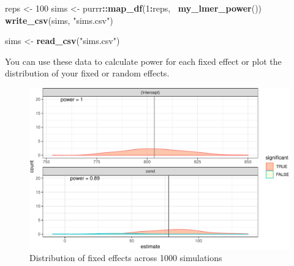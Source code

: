 \documentclass[man,floatsintext]{apa6}
\newenvironment{Shaded}{\begin{snugshade}}{\end{snugshade}}
\newcommand{\KeywordTok}[1]{\textcolor[rgb]{0.13,0.29,0.53}{\textbf{#1}}}
\newcommand{\DecValTok}[1]{\textcolor[rgb]{0.00,0.00,0.81}{#1}}
\newcommand{\StringTok}[1]{\textcolor[rgb]{0.31,0.60,0.02}{#1}}
\newcommand{\OperatorTok}[1]{\textcolor[rgb]{0.81,0.36,0.00}{\textbf{#1}}}
\newcommand{\NormalTok}[1]{#1}
\begin{document}
\begin{Shaded}
\begin{Highlighting}[]
\NormalTok{reps <-}\StringTok{ }\DecValTok{100}
\NormalTok{sims <-}\StringTok{ }\NormalTok{purrr}\OperatorTok{::}\KeywordTok{map_df}\NormalTok{(}\DecValTok{1}\OperatorTok{:}\NormalTok{reps, }\OperatorTok{~}\KeywordTok{my_lmer_power}\NormalTok{())}
\KeywordTok{write_csv}\NormalTok{(sims, }\StringTok{"sims.csv"}\NormalTok{)}
\end{Highlighting}
\end{Shaded}

\begin{Shaded}
\begin{Highlighting}[]
\NormalTok{sims <-}\StringTok{ }\KeywordTok{read_csv}\NormalTok{(}\StringTok{"sims.csv"}\NormalTok{)}
\end{Highlighting}
\end{Shaded}

You can use these data to calculate power for each fixed effect or plot
the distribution of your fixed or random effects.

\begin{figure}

{\centering \includegraphics[width=1\linewidth]{images/sim-fixef-plot-1} 

}

\caption{Distribution of fixed effects across 1000 simulations}\label{fig:sim-fixef-plot}
\end{figure}
\end{document}
